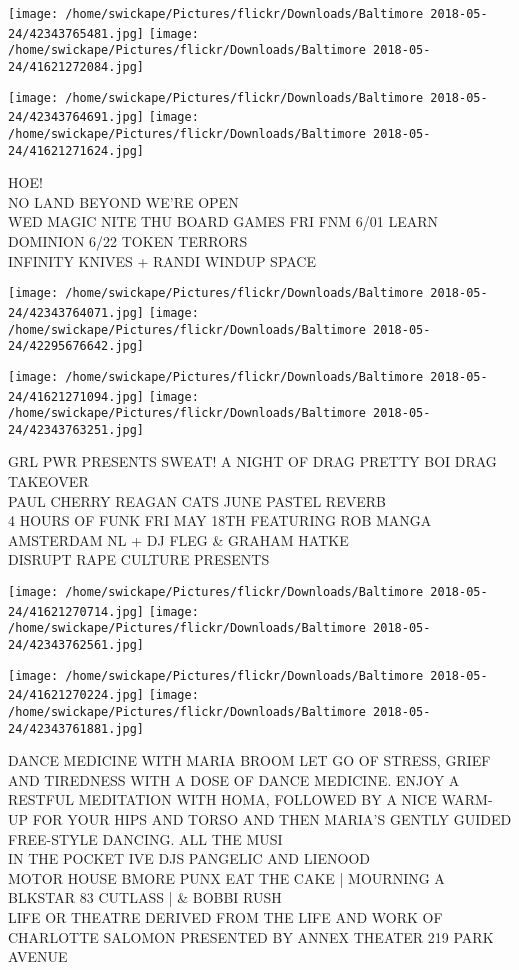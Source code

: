 \documentclass[10pt,letterpaper]{article}
\begin{document}
\texttt{[image: /home/swickape/Pictures/flickr/Downloads/Baltimore 2018-05-24/42343765481.jpg]}
\texttt{[image: /home/swickape/Pictures/flickr/Downloads/Baltimore 2018-05-24/41621272084.jpg]}

\texttt{[image: /home/swickape/Pictures/flickr/Downloads/Baltimore 2018-05-24/42343764691.jpg]}
\texttt{[image: /home/swickape/Pictures/flickr/Downloads/Baltimore 2018-05-24/41621271624.jpg]}

HOE!\\
NO LAND BEYOND WE'RE OPEN\\
WED MAGIC NITE THU BOARD GAMES FRI FNM 6/01 LEARN DOMINION 6/22 TOKEN TERRORS\\
INFINITY KNIVES + RANDI WINDUP SPACE
\pagebreak

\texttt{[image: /home/swickape/Pictures/flickr/Downloads/Baltimore 2018-05-24/42343764071.jpg]}
\texttt{[image: /home/swickape/Pictures/flickr/Downloads/Baltimore 2018-05-24/42295676642.jpg]}

\texttt{[image: /home/swickape/Pictures/flickr/Downloads/Baltimore 2018-05-24/41621271094.jpg]}
\texttt{[image: /home/swickape/Pictures/flickr/Downloads/Baltimore 2018-05-24/42343763251.jpg]}

GRL PWR PRESENTS SWEAT!  A NIGHT OF DRAG PRETTY BOI DRAG TAKEOVER\\
PAUL CHERRY REAGAN CATS JUNE PASTEL REVERB\\
4 HOURS OF FUNK FRI MAY 18TH FEATURING ROB MANGA AMSTERDAM NL + DJ FLEG \& GRAHAM HATKE\\
DISRUPT RAPE CULTURE PRESENTS
\pagebreak

\texttt{[image: /home/swickape/Pictures/flickr/Downloads/Baltimore 2018-05-24/41621270714.jpg]}
\texttt{[image: /home/swickape/Pictures/flickr/Downloads/Baltimore 2018-05-24/42343762561.jpg]}

\texttt{[image: /home/swickape/Pictures/flickr/Downloads/Baltimore 2018-05-24/41621270224.jpg]}
\texttt{[image: /home/swickape/Pictures/flickr/Downloads/Baltimore 2018-05-24/42343761881.jpg]}

DANCE MEDICINE WITH MARIA BROOM LET GO OF STRESS, GRIEF AND TIREDNESS WITH A DOSE OF DANCE MEDICINE.  ENJOY A RESTFUL MEDITATION WITH HOMA, FOLLOWED BY A NICE WARM{-}UP FOR YOUR HIPS AND TORSO AND THEN MARIA'S GENTLY GUIDED FREE{-}STYLE DANCING.  ALL THE MUSI\\
IN THE POCKET IVE DJS PANGELIC AND LIENOOD\\
MOTOR HOUSE BMORE PUNX EAT THE CAKE | MOURNING A BLKSTAR 83 CUTLASS |  \& BOBBI RUSH\\
LIFE OR THEATRE DERIVED FROM THE LIFE AND WORK OF CHARLOTTE SALOMON PRESENTED BY ANNEX THEATER 219 PARK AVENUE
\pagebreak
\end{document}
